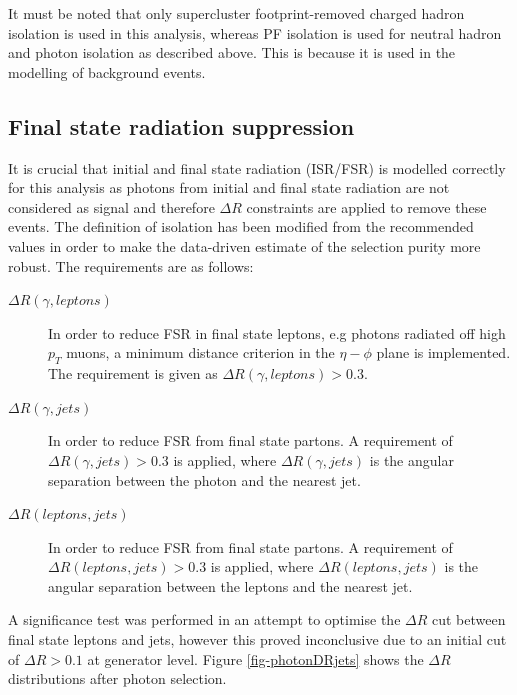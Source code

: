 It must be noted that only supercluster footprint-removed charged hadron isolation is used in this analysis, whereas PF isolation is used for neutral hadron and photon isolation as described above. This is because it is used in the modelling of background events.

\subsection{Final state radiation suppression}

It is crucial that initial and final state radiation (ISR/FSR) is modelled correctly for this analysis as photons from initial and final state radiation are not considered as signal and therefore  $\Delta R$  constraints are applied to remove these events. The definition of isolation has been modified from the recommended values in order to make the data-driven estimate of the selection purity more robust. The requirements are as follows:

\begin{description}
\item[$\Delta R(\gamma, leptons)$] In order to reduce FSR in final state leptons, e.g photons radiated off high $p_T$ muons, a minimum distance criterion in the $\eta - \phi$ plane is implemented. The requirement is given as $\Delta R(\gamma, leptons) > 0.3$.

\item[$\Delta R(\gamma, jets)$] In order to reduce FSR from final state partons. A requirement of $\Delta R(\gamma, jets) > 0.3$ is applied, where $\Delta R(\gamma, jets)$ is the angular separation between the photon and the nearest jet.

\item[$\Delta R(leptons, jets)$] In order to reduce FSR from final state partons. A requirement of $\Delta R(leptons, jets) > 0.3$ is applied, where $\Delta R(leptons, jets)$ is the angular separation between the leptons and the nearest jet.
\end{description}

A significance test was performed in an attempt to optimise the $\Delta R$ cut between final state leptons and jets, however this proved inconclusive due to an initial cut of $\Delta R > 0.1$ at generator level. Figure \ref{fig-photonDRjets} shows the $\Delta R$ distributions after photon selection.

